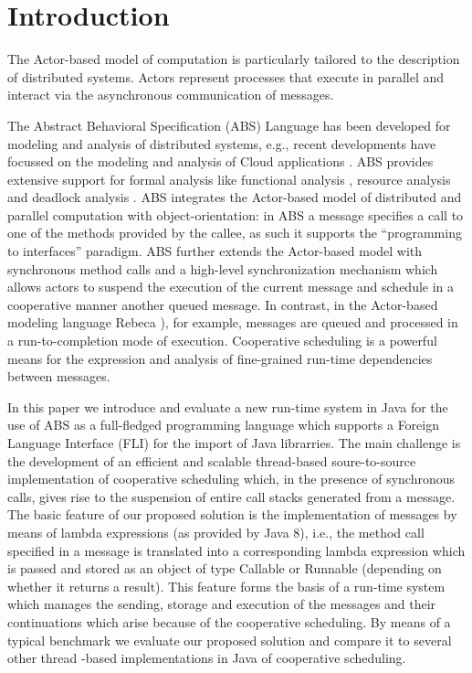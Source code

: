 \section{Introduction}

The Actor-based model of computation \cite{Agha} is particularly tailored to the description of distributed systems.  Actors represent processes that execute in parallel and interact via the asynchronous communication of messages.


The  Abstract Behavioral Specification (ABS) \cite{abs}  Language has been developed
for modeling and analysis of distributed systems, e.g., recent developments
have focussed on the modeling and analysis of Cloud applications \cite{Albert}.
ABS provides  extensive support for  formal analysis like functional analysis \cite{KeY}, resource analysis \cite{saco}  and deadlock analysis \cite{dead}.
 ABS integrates the Actor-based model of distributed and parallel computation with object-orientation:
in ABS a message specifies a  call to one of the methods provided by the callee,
as such it supports the ``programming to interfaces'' paradigm.
ABS further  extends the Actor-based model with  synchronous method calls and a high-level synchronization mechanism which allows actors to suspend the
execution of the current message and schedule in a cooperative manner another
queued message. 
In contrast, in the Actor-based modeling language Rebeca \cite{Sirjani}), for example,
messages are queued and processed in a run-to-completion mode of execution.
Cooperative scheduling   is a powerful means for the expression and analysis
of fine-grained run-time dependencies between messages.



In this paper we introduce  and evaluate a new run-time system in Java for  the use of ABS as a full-fledged programming language which supports a Foreign Language Interface (FLI) for the import of Java librarries. 
The main challenge is the development of an efficient and scalable  thread-based soure-to-source implementation of cooperative scheduling which, in the presence of synchronous calls,   gives rise to the suspension of  entire call stacks generated
from a message.
The basic feature of our proposed solution is the implementation of messages by means of lambda expressions (as provided by Java 8), i.e., the method call specified in a message
is translated into a corresponding lambda expression which is passed and stored as
an object of type Callable or Runnable (depending on whether it returns  a result).
This  feature forms  the basis of a run-time system which manages
the sending, storage and execution of  the messages and their continuations
which arise because of the cooperative scheduling.
By means of a typical benchmark we evaluate our proposed solution and compare it
to several other thread -based implementations in Java of cooperative scheduling.

